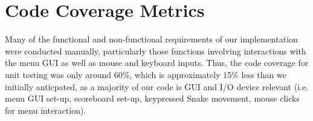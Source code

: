 \documentclass[12pt, titlepage]{article}
\begin{document}
\section{Code Coverage Metrics}
Many of the functional and non-functional requirements of our implementation were conducted manually, particularly those functions involving interactions with the menu GUI as well as mouse and keyboard inputs. Thus, the code coverage for unit testing was only around 60\%, which is approximately 15\% less than we initially anticpated, as a majority of our code is GUI and I/O device relevant (i.e. menu GUI set-up, scoreboard set-up, keypressed Snake movement, mouse clicks for menu interaction).  




\end{document}
